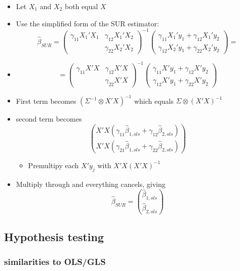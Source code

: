 \documentclass[11pt]{article}
\begin{document}
\begin{itemize}
\item Let $X_1$ and $X_2$ both equal $X$
\item Use the simplified form of the SUR estimator:
        \[\hat\beta_{SUR} = (\begin{matrix} \gamma_{11} X_1'X_1 &
        \gamma_{12} X_1'X_2 \\ & \gamma_{22}
        X_2'X_2 \end{matrix})^{-1} (\begin{matrix} \gamma_{11}
        X_1'y_1 + \gamma_{12} X_1'y_2 \\ \gamma_{12} X_2'y_1 +
        \gamma_{22} X_2'y_2\end{matrix}) = \]
\item \[= (\begin{matrix} \gamma_{11} X'X & \gamma_{12} X'X \\ &
        \gamma_{22}X'X \end{matrix})^{-1} (\begin{matrix} \gamma_{11}
        X'y_1 + \gamma_{12}X'y_2 \\ \gamma_{12} X'y_1 + \gamma_{22}
        X'y_2\end{matrix})\]
\item First term becomes $(\Sigma^{-1} \otimes X'X)^{-1}$ which
        equals $\Sigma \otimes (X'X)^{-1}$
\item second term becomes \[\binom{X'X
        (\gamma_{11}\hat\beta_{1,ols} + \gamma_{12}\hat\beta_{2,ols})}{X'X
        (\gamma_{21}\hat\beta_{1,ols} +
        \gamma_{22}\hat\beta_{2,ols})}   \]
\begin{itemize}
\item Premultipy each $X'y_j$ with $X'X(X'X)^{-1}$
\end{itemize}
\item Multiply through and everything cancels, giving
        \[\hat\beta_{SUR} = \binom{\hat\beta_{1,ols}}{\hat\beta_{2,ols}}\]
\end{itemize}
\subsection{Hypothesis testing}
\label{sec-2-6}
\subsubsection{similarities to OLS/GLS}
\label{sec-2-6-1}
\end{document}
